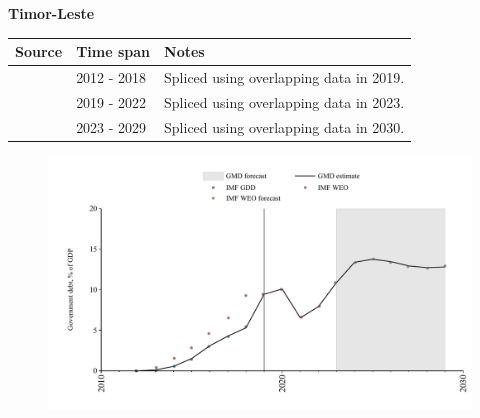 \documentclass[12pt,a4paper,landscape]{article}
\begin{document}
\begin{adjustbox}{max totalsize={\paperwidth}{\paperheight},center}
\begin{minipage}[t][\textheight][t]{\textwidth}
\vspace*{0.5cm}
{}
\begin{center}
{\Large\bfseries Timor-Leste}
\end{center}
\vspace{0.5cm}
\begin{table}[H]
\centering
\small
\begin{tabular}{|l|l|l|}
\hline
\textbf{Source} & \textbf{Time span} & \textbf{Notes} \\
\hline
\rowcolor{white}\cite{IMF_GDD}& 2012 - 2018 &Spliced using overlapping data in 2019.\\
\rowcolor{lightgray}\cite{IMF_WEO}& 2019 - 2022 &Spliced using overlapping data in 2023.\\
\rowcolor{white}\cite{IMF_WEO_forecast}& 2023 - 2029 &Spliced using overlapping data in 2030.\\
\hline
\end{tabular}
\end{table}
\begin{figure}[H]
\centering
\includegraphics[width=\textwidth,height=0.6\textheight,keepaspectratio]{graphs/TLS_govdebt_GDP.pdf}
\end{figure}
\end{minipage}
\end{adjustbox}
\end{document}
